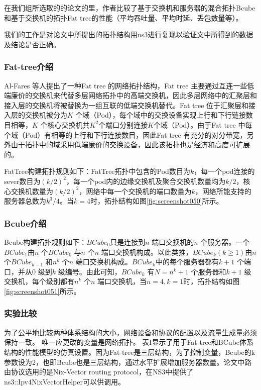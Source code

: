 \documentclass[lang=cn,11pt,a4paper,cite=authoryear]{elegantpaper}
\begin{document}
在我们组所选取的的论文的里，作者比较了基于交换机和服务器的混合拓扑Bcube和基于交换机的拓扑Fat tree的性能（平均吞吐量、平均时延、丢包数量等）。

我们的工作是对论文中所提出的拓扑结构用ns3进行复现以验证文中所得到的数据及结论是否正确。

\subsubsection{Fat-tree介绍}

Al-Fares 等人提出了一种Fat tree 的网络拓扑结构，Fat tree 主要通过互连一些低端廉价的交换机来代替多层网络拓扑中的高端交换机，因此多层网络中的汇聚层和接入层的交换机将被替换为一组互联的低端交换机替代。Fat tree 位于汇聚层和接入层的交换机被分为$K$ 个域（Pod），每个域中的交换设备实现上行和下行链接数目相等，$K$ 个核心交换机共$K^2$个端口分别连接$K$个域（Pod）。由于Fat tree 中每个域（Pod）有相等的上行和下行连接数目，因此Fat tree 有充分的对分带宽，另外由于拓扑中的域采用低端廉价的交换设备，因此该拓扑也是经济和高度可扩展的。

FatTree构建拓扑规则如下：FatTree拓扑中包含的Pod数目为$k$，每一个pod连接的sever数目为$(k/2)^2$，每一个pod内的边缘交换机及聚合交换机数量均为$k/2$，核心交换机数量为$(k/2)^2$，网络中每一个交换机的端口数量为$k$，网络所能支持的服务器总数为$k^3/4$。当$k=4$时，拓扑结构如图\ref{fig:screenshot050}所示。


\subsubsection{Bcube介绍}

Bcube构建拓扑规则如下：$BCube_0$只是连接到$n$ 端口交换机的$n$ 个服务器。一个$BCube_1$由$n$ 个$BCube_0$ 与$n$ 个$n$ 端口交换机构成。以此类推，$BCube_k$$(k\geq1)$由$n$ 个$BCube_{k-1}$ 和$n^k$ 个$n$ 端口交换机构成。$BCube_k$中的每个服务器都有$k + 1$ 个端口，并从$0$ 级到$k$ 级编号。由此可知，$BCube_k$ 有$N = n^k +1$ 个服务器和$k + 1$ 级交换机，每个级别都有$n^k$ 个$n$ 端口交换机，当$n=4,k=1$时，拓扑结构如图\ref{fig:screenshot051}所示。

\subsubsection{实验比较}

为了公平地比较两种体系结构的大小，网络设备和协议的配置以及流量生成量必须保持一致。 唯一应更改的变量是网络拓扑。 表I显示了用于Fat-tree和BCube体系结构的性能模型的仿真设置。因为Fat-tree是三层结构，为了控制变量，Bcube的k参数设为2，也即Bcube也是三层结构，通过水平扩展增加服务器数量。论文中路由协议选用的是Nix-Vector routing protocol，在NS3中提供了ns3::Ipv4NixVectorHelper可以供调用。
\end{document}

